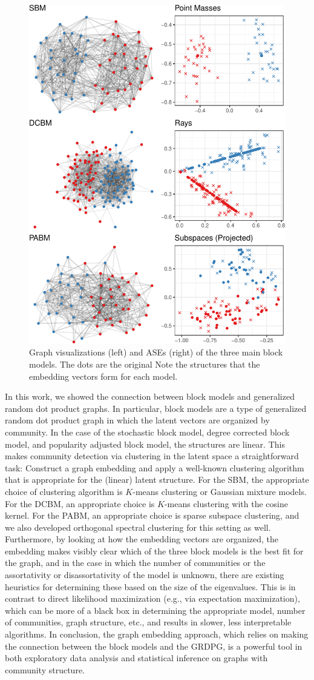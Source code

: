 \documentclass[
  12pt,
]{article}
\theoremstyle{definition}
\theoremstyle{definition}
\theoremstyle{definition}
\theoremstyle{definition}
\theoremstyle{remark}
\begin{document}
\begin{figure}[H]

{\centering \includegraphics[width=0.5\linewidth]{draft_files/figure-latex/block-models-1} 

}

\caption{Graph visualizations (left) and ASEs (right) of the three main block models. The dots are the original Note the structures that the embedding vectors form for each model.}\label{fig:block-models}
\end{figure}

In this work, we showed the connection between block models and generalized random dot product graphs.
In particular, block models are a type of generalized random dot product graph in which the latent vectors are organized by community.
In the case of the stochastic block model, degree corrected block model, and popularity adjusted block model, the structures are linear.
This makes community detection via clustering in the latent space a straightforward task: Construct a graph embedding and apply a well-known clustering algorithm that is appropriate for the (linear) latent structure.
For the SBM, the appropriate choice of clustering algorithm is \(K\)-means clustering or Gaussian mixture models.
For the DCBM, an appropriate choice is \(K\)-means clustering with the cosine kernel.
For the PABM, an appropriate choice is sparse subspace clustering, and we also developed orthogonal spectral clustering for this setting as well.
Furthermore, by looking at how the embedding vectors are organized, the embedding makes visibly clear which of the three block models is the best fit for the graph, and in the case in which the number of communities or the assortativity or disassortativity of the model is unknown, there are existing heuristics for determining these based on the size of the eigenvalues.
This is in contrast to direct likelihood maximization (e.g., via expectation maximization), which can be more of a black box in determining the appropriate model, number of communities, graph structure, etc., and results in slower, less interpretable algorithms.
In conclusion, the graph embedding approach, which relies on making the connection between the block models and the GRDPG, is a powerful tool in both exploratory data analysis and statistical inference on graphs with community structure.
\end{document}
